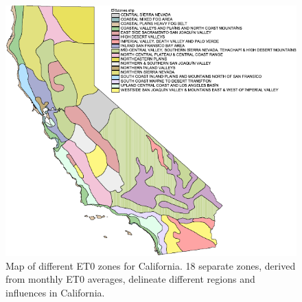\documentclass{elsart}
\begin{document}
\begin{figure}[htbp]
  \centering
  \includegraphics[width=1\textwidth]{etomap_simple.pdf}
  \caption{%
    Map of different \ac{ET0} zones for California.  18 separate
    zones, derived from monthly \ac{ET0} averages, delineate different
    regions and influences in California. }
  \label{fig:et0}
\end{figure}
\end{document}
